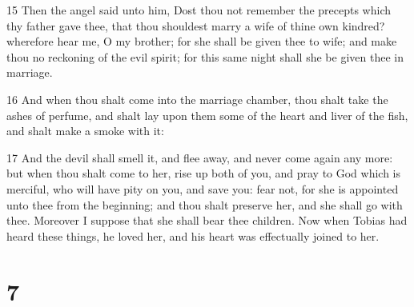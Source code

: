 \par 15 Then the angel said unto him, Dost thou not remember the precepts which thy father gave thee, that thou shouldest marry a wife of thine own kindred? wherefore hear me, O my brother; for she shall be given thee to wife; and make thou no reckoning of the evil spirit; for this same night shall she be given thee in marriage.
\par 16 And when thou shalt come into the marriage chamber, thou shalt take the ashes of perfume, and shalt lay upon them some of the heart and liver of the fish, and shalt make a smoke with it:
\par 17 And the devil shall smell it, and flee away, and never come again any more: but when thou shalt come to her, rise up both of you, and pray to God which is merciful, who will have pity on you, and save you: fear not, for she is appointed unto thee from the beginning; and thou shalt preserve her, and she shall go with thee. Moreover I suppose that she shall bear thee children. Now when Tobias had heard these things, he loved her, and his heart was effectually joined to her.

\chapter{7}

